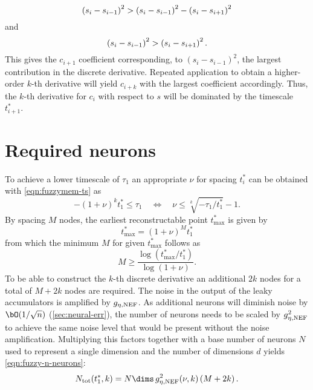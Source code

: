 \begin{equation}
    \del{s_i - s_{i-1}}^2 > \del{s_i - s_{i-1}}^2 - \del{s_i - s_{i+1}}^2
\end{equation}
and
\begin{equation}
    \del{s_i - s_{i-1}}^2 > \del{s_i - s_{i+1}}^2 \text{.}
\end{equation}
This gives the $c_{i+1}$ coefficient corresponding, to $(s_i - s_{i-1})^2$, the largest contribution in the discrete derivative.  %
Repeated application to obtain a higher-order $k$-th derivative will yield $c_{i+k}$ with the largest coefficient accordingly.
Thus, the $k$-th derivative for $c_i$ with respect to $s$ will be dominated by the timescale $t^*_{i+1}$.


\section{Required neurons}\label{apdx:fuzzymem-neurons}
To achieve a lower timescale of $\tau_1$ an appropriate $\nu$ for spacing $t^*_i$ can be obtained with \cref{eqn:fuzzymem-ts} as
\begin{equation}
    -{(1+\nu)}^k t^*_1 \leq \tau_1 \quad\Leftrightarrow\quad \nu \leq \sqrt[k]{-\tau_1 / t^*_1} - 1 \text{.}
\end{equation}
By spacing $M$ nodes, the earliest reconstructable point $t^*_{\max}$ is given by
\begin{equation}
    t^*_{\max} = {(1+\nu)}^M t^*_1
\end{equation}
from which the minimum $M$ for given $t^*_{\max}$ follows as
\begin{equation}
    M \geq \frac{\log(t^*_{\max} / t^*_1)}{\log(1+\nu)} \text{.}
\end{equation}
To be able to construct the $k$-th discrete derivative an additional $2k$ nodes for a total of $M + 2k$ nodes are required.
The noise in the output of the leaky accumulators is amplified by $g_{\eta,{\mathrm{NEF}}}$.
As additional neurons will diminish noise by $\bO(1/\sqrt{n})$ (\cref{sec:neural-err}), the number of neurons needs to be scaled by $g_{\eta,{\mathrm{NEF}}}^2$ to achieve the same noise level that would be present without the noise amplification.
Multiplying this factors together with a base number of neurons $N$ used to represent a single dimension and the number of dimensions $d$ yields \cref{eqn:fuzzy-n-neurons}:
\begin{equation*}
    N_{\ped{tot}}(t^*_1, k) = N \dims\, g_{\eta,\ped{NEF}}^2(\nu, k) \del{M + 2k} \text{.}
\end{equation*}
